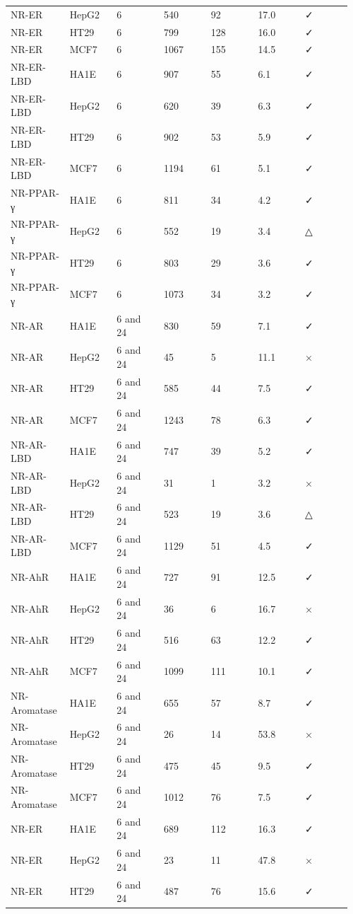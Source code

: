 \begin{longtable}{p{0.137\linewidth}p{0.137\linewidth}p{0.137\linewidth}p{0.137\linewidth}p{0.137\linewidth}p{0.137\linewidth}p{0.137\linewidth}}
NR-ER & HepG2 & 6 & 540 & 92 & 17.0 & ✓ \\
NR-ER & HT29 & 6 & 799 & 128 & 16.0 & ✓ \\
NR-ER & MCF7 & 6 & 1067 & 155 & 14.5 & ✓ \\
NR-ER-LBD & HA1E & 6 & 907 & 55 & 6.1 & ✓ \\
NR-ER-LBD & HepG2 & 6 & 620 & 39 & 6.3 & ✓ \\
NR-ER-LBD & HT29 & 6 & 902 & 53 & 5.9 & ✓ \\
NR-ER-LBD & MCF7 & 6 & 1194 & 61 & 5.1 & ✓ \\
NR-PPAR-γ & HA1E & 6 & 811 & 34 & 4.2 & ✓ \\
NR-PPAR-γ & HepG2 & 6 & 552 & 19 & 3.4 & △ \\
NR-PPAR-γ & HT29 & 6 & 803 & 29 & 3.6 & ✓ \\
NR-PPAR-γ & MCF7 & 6 & 1073 & 34 & 3.2 & ✓ \\
NR-AR & HA1E & 6 and 24 & 830 & 59 & 7.1 & ✓ \\
NR-AR & HepG2 & 6 and 24 & 45 & 5 & 11.1 & × \\
NR-AR & HT29 & 6 and 24 & 585 & 44 & 7.5 & ✓ \\
NR-AR & MCF7 & 6 and 24 & 1243 & 78 & 6.3 & ✓ \\
NR-AR-LBD & HA1E & 6 and 24 & 747 & 39 & 5.2 & ✓ \\
NR-AR-LBD & HepG2 & 6 and 24 & 31 & 1 & 3.2 & × \\
NR-AR-LBD & HT29 & 6 and 24 & 523 & 19 & 3.6 & △ \\
NR-AR-LBD & MCF7 & 6 and 24 & 1129 & 51 & 4.5 & ✓ \\
NR-AhR & HA1E & 6 and 24 & 727 & 91 & 12.5 & ✓ \\
NR-AhR & HepG2 & 6 and 24 & 36 & 6 & 16.7 & × \\
NR-AhR & HT29 & 6 and 24 & 516 & 63 & 12.2 & ✓ \\
NR-AhR & MCF7 & 6 and 24 & 1099 & 111 & 10.1 & ✓ \\
NR-Aromatase & HA1E & 6 and 24 & 655 & 57 & 8.7 & ✓ \\
NR-Aromatase & HepG2 & 6 and 24 & 26 & 14 & 53.8 & × \\
NR-Aromatase & HT29 & 6 and 24 & 475 & 45 & 9.5 & ✓ \\
NR-Aromatase & MCF7 & 6 and 24 & 1012 & 76 & 7.5 & ✓ \\
NR-ER & HA1E & 6 and 24 & 689 & 112 & 16.3 & ✓ \\
NR-ER & HepG2 & 6 and 24 & 23 & 11 & 47.8 & × \\
NR-ER & HT29 & 6 and 24 & 487 & 76 & 15.6 & ✓ \\

\end{longtable}
